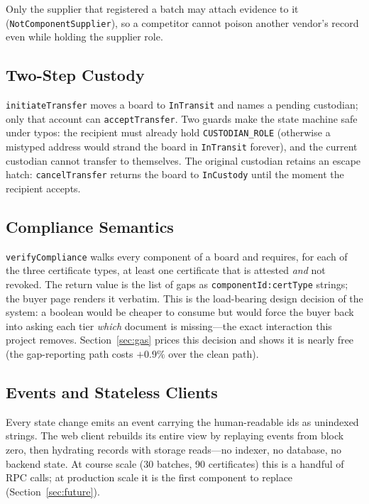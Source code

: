 \documentclass[conference]{IEEEtran}
\begin{document}
Only the supplier that registered a batch may attach evidence to it (\texttt{NotComponentSupplier}), so a competitor cannot poison another vendor's record even while holding the supplier role.

\subsection{Two-Step Custody}
\texttt{initiateTransfer} moves a board to \texttt{InTransit} and names a pending custodian; only that account can \texttt{acceptTransfer}. Two guards make the state machine safe under typos: the recipient must already hold \texttt{CUSTODIAN\_ROLE} (otherwise a mistyped address would strand the board in \texttt{InTransit} forever), and the current custodian cannot transfer to themselves. The original custodian retains an escape hatch: \texttt{cancelTransfer} returns the board to \texttt{InCustody} until the moment the recipient accepts.

\subsection{Compliance Semantics}
\texttt{verifyCompliance} walks every component of a board and requires, for each of the three certificate types, at least one certificate that is attested \emph{and} not revoked. The return value is the list of gaps as \texttt{componentId:certType} strings; the buyer page renders it verbatim. This is the load-bearing design decision of the system: a boolean would be cheaper to consume but would force the buyer back into asking each tier \emph{which} document is missing---the exact interaction this project removes. Section~\ref{sec:gas} prices this decision and shows it is nearly free (the gap-reporting path costs $+0.9\%$ over the clean path).

\subsection{Events and Stateless Clients}
Every state change emits an event carrying the human-readable ids as unindexed strings. The web client rebuilds its entire view by replaying events from block zero, then hydrating records with storage reads---no indexer, no database, no backend state. At course scale (30 batches, 90 certificates) this is a handful of RPC calls; at production scale it is the first component to replace (Section~\ref{sec:future}).
\end{document}
